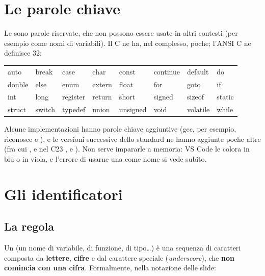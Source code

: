 \section{Le parole chiave}

Le  sono parole riservate, che non possono essere usate
in altri contesti (per esempio come nomi di variabili). Il C ne ha, nel
complesso, poche; l'ANSI C ne definisce 32:

\begin{center}
\renewcommand{\arraystretch}{1.25}
{\FiraCodeNL\small
\begin{tabular}{@{}*{8}{l}@{}}
  \toprule
  auto & break & case & char & const & continue & default & do \\
  double & else & enum & extern & float & for & goto & if \\
  int & long & register & return & short & signed & sizeof & static \\
  struct & switch & typedef & union & unsigned & void & volatile & while \\
  \bottomrule
\end{tabular}}
\end{center}


Alcune implementazioni hanno parole chiave aggiuntive (gcc, per esempio,
riconosce  e ), e le versioni successive dello
standard ne hanno aggiunte poche altre (fra cui , e nel C23
,  e ). Non serve impararle a memoria:
VS Code le colora in blu o in viola, e l'errore di usarne una come nome si
vede subito.

\section{Gli identificatori}

\subsection{La regola}

Un  (un nome di variabile, di funzione, di tipo\dots)
è una sequenza di caratteri composta da \textbf{lettere}, \textbf{cifre} e
dal carattere speciale \code{\_} (\textit{underscore}), che \textbf{non
comincia con una cifra}. Formalmente, nella notazione delle slide:

